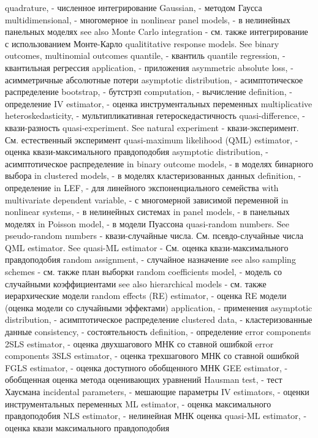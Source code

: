 quadrature, - численное интегрирование
Gaussian, - методом Гаусса
multidimensional, - многомерное
in nonlinear panel models, - в нелинейных панельных моделях
see also Monte Carlo integration - см. также интегрирование с использованием Монте-Карло
qualititative response models. See binary outcomes, multinomial outcomes
quantile, - квантиль
quantile regression, - квантильная регрессия
application, - приложения
asymmetric absolute loss, - асимметричные абсолютные потери
asymptotic distribution, - асимптотическое распределение
bootstrap, - бутстрэп
computation, - вычисление
definition, - определение
IV estimator, - оценка инструментальных переменных
multiplicative heteroskedasticity, - мультипликативная гетероскедастичность
quasi-difference, - квази-разность
quasi-experiment. See natural experiment - квази-эксперимент. См. естественный эксперимент
quasi-maximum likelihood (QML) estimator, - оценка квази-максимального правдоподобия
asymptotic distribution, - асимптотическое распределение
in binary outcome models, - в моделях бинарного выбора
in clustered models, - в моделях кластеризованных данных
definition, - определение
in LEF, - для линейного экспоненциального семейства
with multivariate dependent variable, - с многомерной зависимой переменной
in nonlinear systems, - в нелинейных системах
in panel models, - в панельных моделях
in Poisson model, - в модели Пуассона
quasi-random numbers. See pseudo-random numbers - квази-случайные числа. См. псевдо-случайные числа
QML estimator. See quasi-ML estimator - См. оценка квази-максимального правдоподобия
random assignment, - случайное назначение
see also sampling schemes - см. также план выборки
random coefficients model, - модель со случайными коэффициентами
see also hierarchical models - см. также иерархические модели
random effects (RE) estimator, - оценка RE модели (оценка модели со случайными эффектами)
application, - применения
asymptotic distribution, - асимптотическое распределение
clustered data, - кластеризованные данные
consistency, - состоятельность
definition, - определение
error components 2SLS estimator, - оценка двухшагового МНК со ставной ошибкой    
error components 3SLS estimator, - оценка трехшагового МНК со ставной ошибкой    
FGLS estimator, -  оценка доступного обобщенного МНК
GEE estimator, - обобщенная оценка метода оценивающих уравнений
Hausman test, - тест Хаусмана
incidental parameters, - мешающие параметры
IV estimators, - оценки инструментальных переменных
ML estimator, - оценка максимального правдоподобия
NLS estimator, - нелинейная МНК оценка
quasi-ML estimator, - оценка квази максимального правдоподобия
